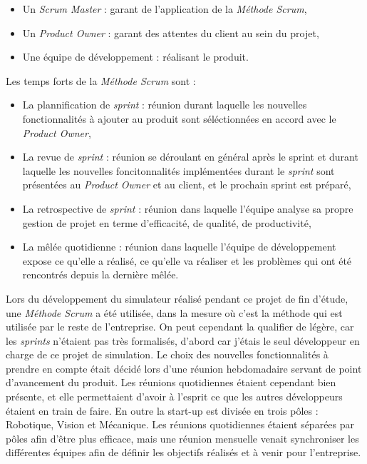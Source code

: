 			\begin{itemize}
				\item Un \textit{Scrum Master} : garant de l'application de la \textit{Méthode Scrum},
				\item Un \textit{Product Owner} : garant des attentes du client au sein du projet,
				\item Une équipe de développement : réalisant le produit.
			\end{itemize}

			Les temps forts de la \textit{Méthode Scrum} sont :

			\begin{itemize}
				\item La plannification de \textit{sprint} : réunion durant laquelle les nouvelles fonctionnalités à ajouter au produit sont séléctionnées en accord avec le \textit{Product Owner},
				\item La revue de \textit{sprint} : réunion se déroulant en général après le sprint et durant laquelle les nouvelles foncitonnalités implémentées durant le \textit{sprint} sont présentées au \textit{Product Owner} et au client, et le prochain sprint est préparé,
				\item La retrospective de \textit{sprint} : réunion dans laquelle l'équipe analyse sa propre gestion de projet en terme d'efficacité, de qualité, de productivité,
				\item La mêlée quotidienne : réunion dans laquelle l'équipe de développement expose ce qu'elle a réalisé, ce qu'elle va réaliser et les problèmes qui ont été rencontrés depuis la dernière mêlée.
			\end{itemize}
		
			Lors du développement du simulateur réalisé pendant ce projet de fin d'étude, une \textit{Méthode Scrum} a été utilisée, dans la mesure où c'est la méthode qui est utilisée par le reste de l'entreprise. On peut cependant la qualifier de légère, car les \textit{sprints} n'étaient pas très formalisés, d'abord car j'étais le seul développeur en charge de ce projet de simulation. Le choix des nouvelles fonctionnalités à prendre en compte était décidé lors d'une réunion hebdomadaire servant de point d'avancement du produit. Les réunions quotidiennes étaient cependant bien présente, et elle permettaient d'avoir à l'esprit ce que les autres développeurs étaient en train de faire. En outre la start-up est divisée en trois pôles : Robotique, Vision et Mécanique. Les réunions quotidiennes étaient séparées par pôles afin d'être plus efficace, mais une réunion mensuelle venait synchroniser les différentes équipes afin de définir les objectifs réalisés et à venir pour l'entreprise.

